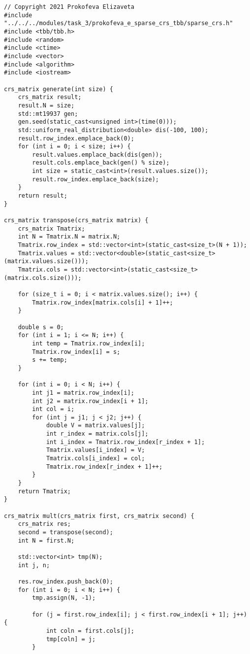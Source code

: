\documentclass{report}
\begin{document}
\begin{lstlisting}
// Copyright 2021 Prokofeva Elizaveta
#include "../../../modules/task_3/prokofeva_e_sparse_crs_tbb/sparse_crs.h"
#include <tbb/tbb.h>
#include <random>
#include <ctime>
#include <vector>
#include <algorithm>
#include <iostream>

crs_matrix generate(int size) {
    crs_matrix result;
    result.N = size;
    std::mt19937 gen;
    gen.seed(static_cast<unsigned int>(time(0)));
    std::uniform_real_distribution<double> dis(-100, 100);
    result.row_index.emplace_back(0);
    for (int i = 0; i < size; i++) {
        result.values.emplace_back(dis(gen));
        result.cols.emplace_back(gen() % size);
        int size = static_cast<int>(result.values.size());
        result.row_index.emplace_back(size);
    }
    return result;
}

crs_matrix transpose(crs_matrix matrix) {
    crs_matrix Tmatrix;
    int N = Tmatrix.N = matrix.N;
    Tmatrix.row_index = std::vector<int>(static_cast<size_t>(N + 1));
    Tmatrix.values = std::vector<double>(static_cast<size_t>(matrix.values.size()));
    Tmatrix.cols = std::vector<int>(static_cast<size_t>(matrix.cols.size()));

    for (size_t i = 0; i < matrix.values.size(); i++) {
        Tmatrix.row_index[matrix.cols[i] + 1]++;
    }

    double s = 0;
    for (int i = 1; i <= N; i++) {
        int temp = Tmatrix.row_index[i];
        Tmatrix.row_index[i] = s;
        s += temp;
    }

    for (int i = 0; i < N; i++) {
        int j1 = matrix.row_index[i];
        int j2 = matrix.row_index[i + 1];
        int col = i;
        for (int j = j1; j < j2; j++) {
            double V = matrix.values[j];
            int r_index = matrix.cols[j];
            int i_index = Tmatrix.row_index[r_index + 1];
            Tmatrix.values[i_index] = V;
            Tmatrix.cols[i_index] = col;
            Tmatrix.row_index[r_index + 1]++;
        }
    }
    return Tmatrix;
}

crs_matrix mult(crs_matrix first, crs_matrix second) {
    crs_matrix res;
    second = transpose(second);
    int N = first.N;

    std::vector<int> tmp(N);
    int j, n;

    res.row_index.push_back(0);
    for (int i = 0; i < N; i++) {
        tmp.assign(N, -1);

        for (j = first.row_index[i]; j < first.row_index[i + 1]; j++) {
            int coln = first.cols[j];
            tmp[coln] = j;
        }


\end{lstlisting}
\end{document}
